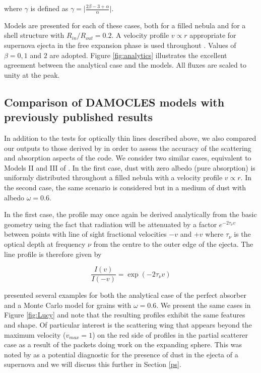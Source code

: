 \noindent where $\gamma$ is defined as $\gamma= \lvert 
\frac{2\beta-3+\alpha}{\alpha} \rvert$.

Models are presented for each of these cases, both for a filled nebula and 
for a shell structure with $R_{in}/R_{out}=0.2$.  A velocity profile $v 
\propto r$ appropriate for supernova ejecta in the free expansion phase is 
used throughout \citep{Li1992,Xu1992,McCray1996,Baron2005}.  Values of 
$\beta = 0, 1$ and $2$ are adopted.  Figure \ref{fig:analytics} 
illustrates the excellent agreement between the analytical case and the 
models.  All fluxes are scaled to unity at the peak.

\subsection{Comparison of DAMOCLES models with previously published results}
\label{opt_thick_testing}

In addition to the tests for optically thin lines described above, we also 
compared our outputs to those derived by \citet{Lucy1989} in order to 
assess the accuracy of the scattering and absorption aspects of the code.  
We consider two similar cases, equivalent to Models II and III of 
\citet{Lucy1989}. In the first case, dust with zero albedo (pure absorption) is 
uniformly distributed throughout a filled nebula with a velocity profile 
$v \propto r$.  In the second case, the same scenario is considered but in a 
medium of dust with albedo $\omega =0.6$.

In the first case, the profile may once again be derived analytically from 
the basic geometry using the fact that radiation will be attenuated by a 
factor $e^{-2\tau_{\nu} v}$ between points with line of sight fractional 
velocities $-v$ and $+v$ where $\tau_{\nu}$ is the optical depth at 
frequency $\nu$ from the centre to the outer edge of the ejecta.  The line 
profile is therefore given by

\begin{equation}
\frac{I(v)}{I(-v)} = \exp(-2\tau_{\nu} v)  
\end{equation}

\citet{Lucy1989} presented several examples for both the analytical case of 
the perfect absorber and a Monte Carlo model for grains with $\omega 
=0.6$.  We present the same cases in Figure \ref{fig:Lucy} and note that 
the resulting profiles exhibit the same features and shape. Of particular 
interest is the scattering wing that appears beyond the maximum velocity 
($v_{max}=1$) on the red side of profiles in the partial 
scatterer case as a result of the packets doing work on the expanding sphere.  
This was noted by \citet{Lucy1989} as a potential diagnostic for the 
presence of dust in the ejecta of a supernova and we will discuss this 
further in Section \ref{ps}.


